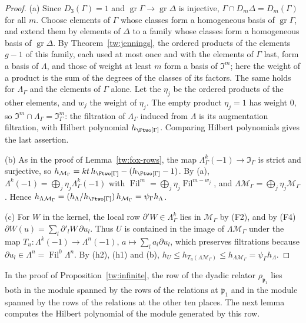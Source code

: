 \begin{proof}
(a) Since $D_3(\Gamma)=1$ and $\operatorname{gr}\Gamma\to\operatorname{gr}\Delta$
is injective, $\Gamma\cap D_m\Delta=D_m(\Gamma)$ for all $m$. Choose elements
of $\Gamma$ whose classes form a homogeneous basis of $\operatorname{gr}\Gamma$,
and extend them by elements of $\Delta$ to a family whose classes form a
homogeneous basis of $\operatorname{gr}\Delta$. By Theorem~\ref{tw:jennings},
the ordered products of the elements $g-1$ of this family, each used at most
once and with the elements of $\Gamma$ last, form a basis of $\Lambda$, and
those of weight at least $m$ form a basis of $\mathfrak I^m$; here the weight
of a product is the sum of the degrees of the classes of its factors. The
same holds for $\Lambda_\Gamma$ and the elements of $\Gamma$ alone. Let the
$\eta_j$ be the ordered products of the other elements, and $w_j$ the weight
of $\eta_j$. The empty product $\eta_j=1$ has weight $0$, so
$\mathfrak I^m\cap\Lambda_\Gamma=\mathfrak I_\Gamma^m$: the filtration of
$\Lambda_\Gamma$ induced from $\Lambda$ is its augmentation filtration, with
Hilbert polynomial $h_{\Ftwo[\Gamma]}$. Comparing Hilbert polynomials gives the
last assertion.

(b) As in the proof of Lemma~\ref{tw:fox-rows}, the map
$\Lambda_\Gamma^k(-1)\to\mathfrak I_\Gamma$ is strict and surjective, so
$h_{\mathcal M_\Gamma}=kt\,h_{\Ftwo[\Gamma]}-(h_{\Ftwo[\Gamma]}-1)$. By (a),
$\Lambda^k(-1)=\bigoplus_j\eta_j\Lambda_\Gamma^k(-1)$ with
$\operatorname{Fil}^m=\bigoplus_j\eta_j\operatorname{Fil}^{m-w_j}$, and
$\Lambda\mathcal M_\Gamma=\bigoplus_j\eta_j\mathcal M_\Gamma$. Hence
$h_{\Lambda\mathcal M_\Gamma}=(h_\Lambda/h_{\Ftwo[\Gamma]})\,h_{\mathcal M_\Gamma}=\psi_\Gamma h_\Lambda$.

(c) For $W$ in the kernel, the local row $\partial'W\in\Lambda_\Gamma^k$ lies in
$\mathcal M_\Gamma$ by (F2), and by (F4)
$\partial W(u)=\sum_l\partial'_lW\,\partial u_l$. Thus $U$ is contained in the
image of $\Lambda\mathcal M_\Gamma$ under the map
$T_u\colon\Lambda^k(-1)\to\Lambda^n(-1)$, $a\mapsto\sum_la_l\partial u_l$,
which preserves filtrations because
$\partial u_l\in\Lambda^n=\operatorname{Fil}^0\Lambda^n$. By (h2),
(h1) and (b),
$h_U\le h_{T_u(\Lambda\mathcal M_\Gamma)}\le h_{\Lambda\mathcal M_\Gamma}=\psi_\Gamma h_\Lambda$.
\end{proof}

In the proof of Proposition~\ref{tw:infinite}, the row of the dyadic relator
$\rho_{\mathfrak p_1}$ lies both in the module spanned by the rows of the
relations at $\mathfrak p_1$ and in the module spanned by the rows of the
relations at the other ten places. The next lemma computes the Hilbert
polynomial of the module generated by this row.

